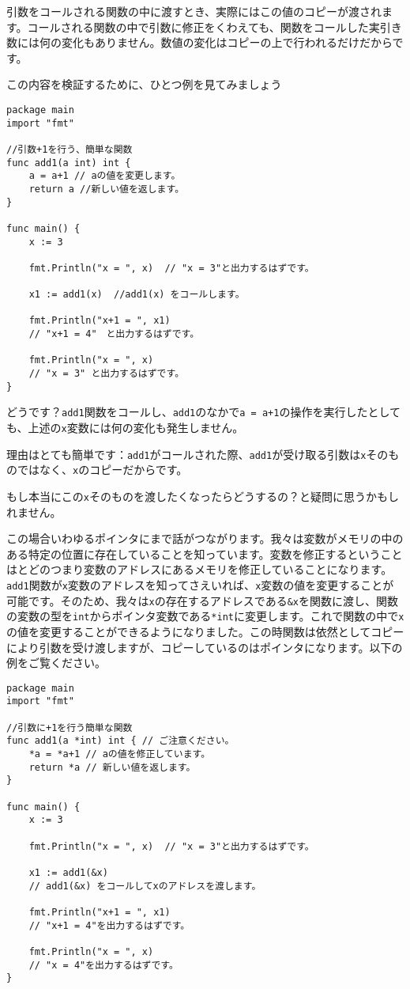 引数をコールされる関数の中に渡すとき、実際にはこの値のコピーが渡されます。コールされる関数の中で引数に修正をくわえても、関数をコールした実引き数には何の変化もありません。数値の変化はコピーの上で行われるだけだからです。

この内容を検証するために、ひとつ例を見てみましょう


\begin{lstlisting}[numbers=none]
package main
import "fmt"

//引数+1を行う、簡単な関数
func add1(a int) int {
    a = a+1 // aの値を変更します。
    return a //新しい値を返します。
}

func main() {
    x := 3

    fmt.Println("x = ", x)  // "x = 3"と出力するはずです。

    x1 := add1(x)  //add1(x) をコールします。

    fmt.Println("x+1 = ", x1)
    // "x+1 = 4"　と出力するはずです。

    fmt.Println("x = ", x)
    // "x = 3" と出力するはずです。
}
\end{lstlisting}

どうです？\texttt{add1}関数をコールし、\texttt{add1}のなかで\texttt{a = a+1}の操作を実行したとしても、上述の\texttt{x}変数には何の変化も発生しません。

理由はとても簡単です：\texttt{add1}がコールされた際、\texttt{add1}が受け取る引数は\texttt{x}そのものではなく、\texttt{x}のコピーだからです。

もし本当にこの\texttt{x}そのものを渡したくなったらどうするの？と疑問に思うかもしれません。

この場合いわゆるポインタにまで話がつながります。我々は変数がメモリの中のある特定の位置に存在していることを知っています。変数を修正するということはとどのつまり変数のアドレスにあるメモリを修正していることになります。\texttt{add1}関数が\texttt{x}変数のアドレスを知ってさえいれば、\texttt{x}変数の値を変更することが可能です。そのため、我々は\texttt{x}の存在するアドレスである\texttt{\&x}を関数に渡し、関数の変数の型を\texttt{int}からポインタ変数である\texttt{*int}に変更します。これで関数の中で\texttt{x}の値を変更することができるようになりました。この時関数は依然としてコピーにより引数を受け渡しますが、コピーしているのはポインタになります。以下の例をご覧ください。

\begin{lstlisting}[numbers=none]
package main
import "fmt"

//引数に+1を行う簡単な関数
func add1(a *int) int { // ご注意ください。
    *a = *a+1 // aの値を修正しています。
    return *a // 新しい値を返します。
}

func main() {
    x := 3

    fmt.Println("x = ", x)  // "x = 3"と出力するはずです。

    x1 := add1(&x)
    // add1(&x) をコールしてxのアドレスを渡します。

    fmt.Println("x+1 = ", x1)
    // "x+1 = 4"を出力するはずです。

    fmt.Println("x = ", x)
    // "x = 4"を出力するはずです。
}
\end{lstlisting}

